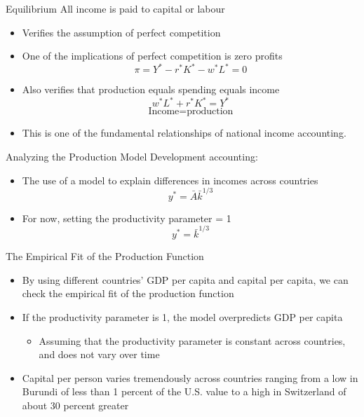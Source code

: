 \documentclass[aspectratio=1610]{beamer}
\begin{document}
\begin{frame}[wide]{Equilibrium}
	All income is paid to capital or labour
	\begin{itemize}
		\item Verifies the assumption of perfect competition
		\item One of the implications of perfect competition is zero profits
			\[\pi = Y^* - r^*K^* - w^*L^* = 0\]
		\item Also verifies that production equals spending equals income
			\[w^*L^* + r^* K^* = Y^*\]
			\[\text{Income} = \text{production}\]
		\item This is one of the fundamental relationships of national income accounting.
	\end{itemize}
\end{frame}

\begin{frame}[wide]{Analyzing the Production Model}
	Development accounting:
	\begin{itemize}
		\item The use of a model to explain differences in incomes across countries
			\[y^* = \bar{A} \bar{k}^{1/3}\]
		\item For now, setting the productivity parameter = 1
			\[y^* = \bar{k}^{1/3}\]
		
	\end{itemize}
\end{frame}

\begin{frame}[wide]{The Empirical Fit of the Production Function }
	\begin{itemize}
		\item By using different countries' GDP per capita and capital per capita, we can check the empirical fit of the production function
		\item If the productivity parameter is 1, the model overpredicts GDP per capita
		\begin{itemize}
			\item Assuming that the productivity parameter is constant across countries, and does not vary over time
		\end{itemize}
		\item Capital per person varies tremendously across countries ranging from a low in Burundi of less than 1 percent of the U.S. value to a high in Switzerland of about 30 percent greater

	\end{itemize}
\end{frame}
\end{document}

